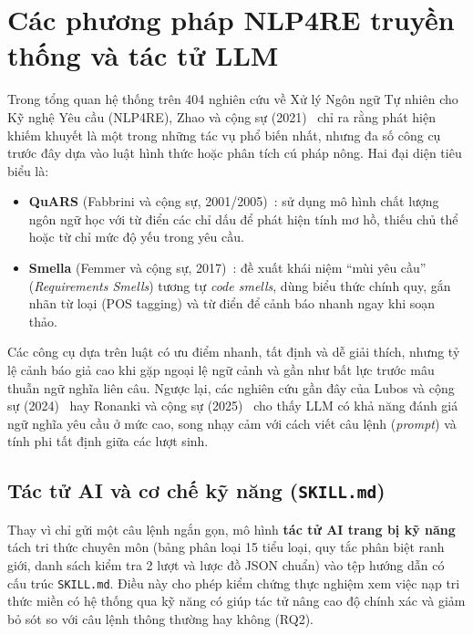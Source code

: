 \documentclass[12pt,a4paper]{report}
\begin{document}
\section{Các phương pháp NLP4RE truyền thống và tác tử LLM}
Trong tổng quan hệ thống trên 404 nghiên cứu về Xử lý Ngôn ngữ Tự nhiên cho Kỹ nghệ Yêu cầu (NLP4RE), Zhao và cộng sự (2021)~\cite{zhao2021} chỉ ra rằng phát hiện khiếm khuyết là một trong những tác vụ phổ biến nhất, nhưng đa số công cụ trước đây dựa vào luật hình thức hoặc phân tích cú pháp nông. Hai đại diện tiêu biểu là:
\begin{itemize}
  \item \textbf{QuARS} (Fabbrini và cộng sự, 2001/2005)~\cite{fabbrini2001,fabbrini2005}: sử dụng mô hình chất lượng ngôn ngữ học với từ điển các chỉ dấu để phát hiện tính mơ hồ, thiếu chủ thể hoặc từ chỉ mức độ yếu trong yêu cầu.
  \item \textbf{Smella} (Femmer và cộng sự, 2017)~\cite{femmer2017}: đề xuất khái niệm ``mùi yêu cầu'' (\textit{Requirements Smells}) tương tự \textit{code smells}, dùng biểu thức chính quy, gắn nhãn từ loại (POS tagging) và từ điển để cảnh báo nhanh ngay khi soạn thảo.
\end{itemize}

Các công cụ dựa trên luật có ưu điểm nhanh, tất định và dễ giải thích, nhưng tỷ lệ cảnh báo giả cao khi gặp ngoại lệ ngữ cảnh và gần như bất lực trước mâu thuẫn ngữ nghĩa liên câu. Ngược lại, các nghiên cứu gần đây của Lubos và cộng sự (2024)~\cite{lubos2024} hay Ronanki và cộng sự (2025)~\cite{ronanki2025} cho thấy LLM có khả năng đánh giá ngữ nghĩa yêu cầu ở mức cao, song nhạy cảm với cách viết câu lệnh (\textit{prompt}) và tính phi tất định giữa các lượt sinh.

\subsection{Tác tử AI và cơ chế kỹ năng (\texttt{SKILL.md})}
Thay vì chỉ gửi một câu lệnh ngắn gọn, mô hình \textbf{tác tử AI trang bị kỹ năng} tách tri thức chuyên môn (bảng phân loại 15 tiểu loại, quy tắc phân biệt ranh giới, danh sách kiểm tra 2 lượt và lược đồ JSON chuẩn) vào tệp hướng dẫn có cấu trúc \texttt{SKILL.md}. Điều này cho phép kiểm chứng thực nghiệm xem việc nạp tri thức miền có hệ thống qua kỹ năng có giúp tác tử nâng cao độ chính xác và giảm bỏ sót so với câu lệnh thông thường hay không (RQ2).

\end{document}
